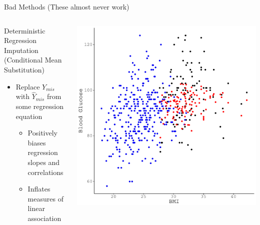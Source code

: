 \documentclass{beamer}\usepackage[]{graphicx}\usepackage[]{color}
\makeatletter
\def\maxwidth{ %
  \ifdim\Gin@nat@width>\linewidth
    \linewidth
  \else
    \Gin@nat@width
  \fi
}
\newenvironment{knitrout}{}{} %
\makeatother
\begin{document}

\begin{frame}{Bad Methods (These almost never work)} 

  \begin{columns}
    \begin{column}{0.5\textwidth}
      
      Deterministic Regression Imputation\\
      (Conditional Mean Substitution)
      \begin{itemize}
      \item Replace $Y_{mis}$ with $\widehat{Y}_{mis}$ from some regression 
        equation
        \begin{itemize}
        \item Positively biases regression slopes and correlations
        \item Inflates measures of linear association
        \end{itemize}
      \end{itemize}
      
    \end{column}
    \begin{column}{0.5\textwidth}
      
\begin{knitrout}\footnotesize
{}\color{fgcolor}

{\centering \includegraphics[width=\maxwidth]{figure/unnamed-chunk-21-1} 

}



\end{knitrout}

\end{column}
\end{columns}

\end{frame}
\end{document}
